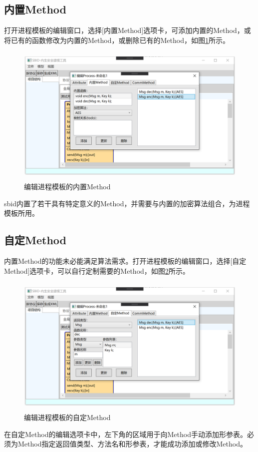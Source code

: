 \subsection{内置Method}
打开进程模板的编辑窗口，选择[内置Method]选项卡，可添加内置的Method，或将已有的函数修改为内置的Method，或删除已有的Method，如图\ref{process_edit_innermethod}所示。
    \begin{figure}[h]
	\centering
	\includegraphics[width=12cm,height=6.75cm]{imgs/process_edit_innermethod.png}
	\caption{编辑进程模板的内置Method}
	\label{process_edit_innermethod}
	\end{figure}
\par
sbid内置了若干具有特定意义的Method，并需要与内置的加密算法组合，为进程模板所用。
\subsection{自定Method}
内置Method的功能未必能满足算法需求。打开进程模板的编辑窗口，选择[自定Method]选项卡，可以自行定制需要的Method，如图\ref{process_edit_zdmethod}所示。
\begin{figure}[h]
	\centering
	\includegraphics[width=12cm,height=6.75cm]{imgs/process_edit_zdmethod.png}
	\caption{编辑进程模板的自定Method}
	\label{process_edit_zdmethod}
	\end{figure}
\par
在自定Method的编辑选项卡中，左下角的区域用于向Method手动添加形参表。必须为Method指定返回值类型、方法名和形参表，才能成功添加或修改Method。

